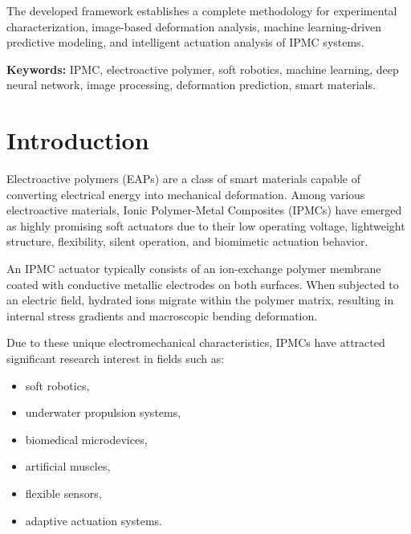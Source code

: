 \documentclass[11pt,a4paper]{article}
\begin{document}
The developed framework establishes a complete methodology for experimental characterization, image-based deformation analysis, machine learning-driven predictive modeling, and intelligent actuation analysis of IPMC systems.

\vspace{0.4cm}

\noindent
\textbf{Keywords:}
IPMC, electroactive polymer, soft robotics, machine learning, deep neural network, image processing, deformation prediction, smart materials.


\newpage
\tableofcontents

\newpage


\section{Introduction}

Electroactive polymers (EAPs) are a class of smart materials capable of converting electrical energy into mechanical deformation. Among various electroactive materials, Ionic Polymer-Metal Composites (IPMCs) have emerged as highly promising soft actuators due to their low operating voltage, lightweight structure, flexibility, silent operation, and biomimetic actuation behavior.

An IPMC actuator typically consists of an ion-exchange polymer membrane coated with conductive metallic electrodes on both surfaces. When subjected to an electric field, hydrated ions migrate within the polymer matrix, resulting in internal stress gradients and macroscopic bending deformation.

Due to these unique electromechanical characteristics, IPMCs have attracted significant research interest in fields such as:

\begin{itemize}

\item soft robotics,

\item underwater propulsion systems,

\item biomedical microdevices,

\item artificial muscles,

\item flexible sensors,

\item adaptive actuation systems.

\end{itemize}
\end{document}
